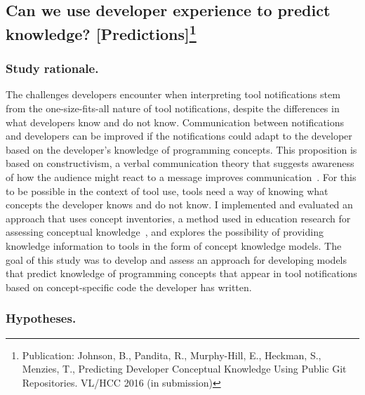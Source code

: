 \documentclass{llncs}
\begin{document}
\subsection{Can we use developer experience to predict knowledge? [Predictions]\protect\footnote{Publication: Johnson, B., Pandita, R., Murphy-Hill, E., Heckman, S., Menzies, T., Predicting Developer Conceptual Knowledge Using Public Git Repositories. VL/HCC 2016 (in submission)}}\label{subsec:s3}

\subsubsection{Study rationale.}
The challenges developers encounter when interpreting tool notifications stem from the one-size-fits-all nature of tool notifications, despite the differences in what developers know and do not know.
Communication between notifications and developers can be improved if the notifications could adapt to the developer based on the developer's knowledge of programming concepts.
This proposition is based on constructivism, a verbal communication theory that suggests awareness of how the audience might react to a message improves communication~\cite{griffin2011first}. For this to be possible in the context of tool use, tools need a way of knowing what concepts the developer knows and do not know.
I implemented and evaluated an approach that uses concept inventories, a method used in education research for assessing conceptual knowledge~\cite{tew2010assessing}, and explores the possibility of providing knowledge information to tools in the form of concept knowledge models. 
The goal of this study was to develop and assess an approach for developing models that predict knowledge of programming concepts that appear in tool notifications based on concept-specific code the developer has written. 

\subsubsection{Hypotheses.}
\end{document}

